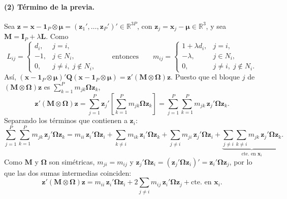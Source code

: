 \documentclass[11pt,a4paper]{article}
\begin{document}
\paragraph{(2) Término de la previa.}
Sea $\boldsymbol{z}=\boldsymbol{x}-\boldsymbol{1}_P\otimes\boldsymbol{\mu}=(\boldsymbol{z}_1',\ldots,\boldsymbol{z}_P')'\in\mathbb{R}^{3P}$, con $\boldsymbol{z}_j=\boldsymbol{x}_j-\boldsymbol{\mu}\in\mathbb{R}^3$, y sea $\mathbf{M}=\mathbf{I}_P+\lambda\mathbf{L}$. Como
\[
L_{ij}=\begin{cases}
d_i, & j=i,\\
-1, & j\in N_i,\\
0, & j\neq i,\; j\notin N_i,
\end{cases}
\qquad\text{entonces}\qquad
m_{ij}=\begin{cases}
1+\lambda d_i, & j=i,\\
-\lambda, & j\in N_i,\\
0, & j\neq i,\; j\notin N_i .
\end{cases}
\]
Así, $(\boldsymbol{x}-\boldsymbol{1}_P\otimes\boldsymbol{\mu})'\mathbf{Q}(\boldsymbol{x}-\boldsymbol{1}_P\otimes\boldsymbol{\mu})=\boldsymbol{z}'(\mathbf{M}\otimes\mathbf{\Omega})\boldsymbol{z}$. Puesto que el bloque $j$ de $(\mathbf{M}\otimes\mathbf{\Omega})\boldsymbol{z}$ es $\sum_{k=1}^{P} m_{jk}\mathbf{\Omega}\boldsymbol{z}_k$,
\[
\boldsymbol{z}'(\mathbf{M}\otimes\mathbf{\Omega})\boldsymbol{z}
=\sum_{j=1}^{P}\boldsymbol{z}_j'\left[\sum_{k=1}^{P} m_{jk}\mathbf{\Omega}\boldsymbol{z}_k\right]
=\sum_{j=1}^{P}\sum_{k=1}^{P} m_{jk}\,\boldsymbol{z}_j'\mathbf{\Omega}\boldsymbol{z}_k .
\]
Separando los términos que contienen a $\boldsymbol{z}_i$:
\[
\sum_{j=1}^{P}\sum_{k=1}^{P} m_{jk}\,\boldsymbol{z}_j'\mathbf{\Omega}\boldsymbol{z}_k
= m_{ii}\,\boldsymbol{z}_i'\mathbf{\Omega}\boldsymbol{z}_i
+\sum_{k\neq i} m_{ik}\,\boldsymbol{z}_i'\mathbf{\Omega}\boldsymbol{z}_k
+\sum_{j\neq i} m_{ji}\,\boldsymbol{z}_j'\mathbf{\Omega}\boldsymbol{z}_i
+\underbrace{\sum_{j\neq i}\sum_{k\neq i} m_{jk}\,\boldsymbol{z}_j'\mathbf{\Omega}\boldsymbol{z}_k}_{\text{cte. en }\boldsymbol{x}_i}.
\]
Como $\mathbf{M}$ y $\mathbf{\Omega}$ son simétricas, $m_{ji}=m_{ij}$ y $\boldsymbol{z}_j'\mathbf{\Omega}\boldsymbol{z}_i=(\boldsymbol{z}_j'\mathbf{\Omega}\boldsymbol{z}_i)'=\boldsymbol{z}_i'\mathbf{\Omega}\boldsymbol{z}_j$, por lo que las dos sumas intermedias coinciden:
\[
\boldsymbol{z}'(\mathbf{M}\otimes\mathbf{\Omega})\boldsymbol{z}
= m_{ii}\,\boldsymbol{z}_i'\mathbf{\Omega}\boldsymbol{z}_i
+2\sum_{j\neq i} m_{ij}\,\boldsymbol{z}_i'\mathbf{\Omega}\boldsymbol{z}_j
+\text{cte. en }\boldsymbol{x}_i .
\]
\end{document}
